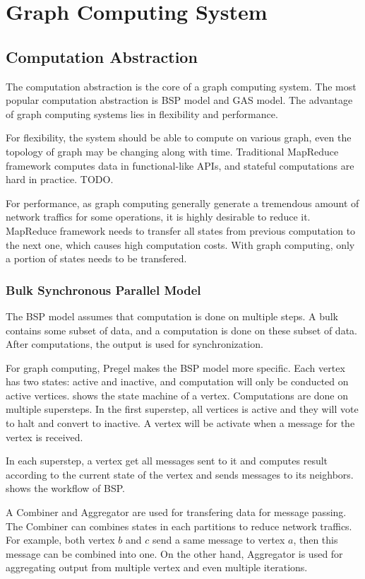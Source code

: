\section{Graph Computing System}
\subsection{Computation Abstraction}
The computation abstraction is the core of a graph computing system. The
most popular computation abstraction is BSP model and GAS model.
The advantage of graph computing systems lies in flexibility and performance.

For flexibility, the system should be able to compute on various
graph, even the topology of graph may be changing along with time.
Traditional MapReduce framework computes data in functional-like
APIs, and stateful computations are hard in practice. TODO.

For performance, as graph computing generally generate a tremendous
amount of network traffics for some operations,
it is highly desirable to reduce it. MapReduce framework needs to transfer
all states from previous computation to the next one, which causes high computation
costs. With graph computing, only a portion of states needs to be transfered.


\subsubsection{Bulk Synchronous Parallel Model}
The BSP model assumes that computation is done on multiple steps. A bulk contains
some subset of data, and a computation is done on these subset of data. After
computations, the output is used for synchronization.

For graph computing, Pregel makes the BSP model more specific.
Each vertex has two states: active and inactive, and computation
will only be conducted on active vertices.  shows the
state machine of a vertex. Computations are done on multiple
supersteps. In the first superstep, all vertices is active and they
will vote to halt and convert to inactive. A vertex will be activate
when a message for the vertex is received.

In each superstep, a vertex get all messages sent to it and computes
result according to the current state of the vertex and sends messages
to its neighbors.  shows the workflow of BSP.

A Combiner and Aggregator are used for transfering data for message
passing. The Combiner can combines states in each partitions to reduce
network traffics. For example, both vertex $b$ and $c$ send a same
message to vertex $a$, then this message can be combined into one.
On the other hand, Aggregator is used for aggregating output from multiple
vertex and even multiple iterations.

